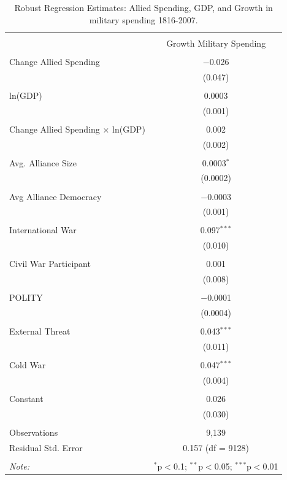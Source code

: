 \documentclass[12pt]{article}
\begin{document}
\begin{table}[!htbp] \centering 
  \caption{} 
  \label{} 
\begin{tabular}{@{\extracolsep{5pt}}lc} 
\\[-1.8ex]\hline 
\hline \\[-1.8ex] 
  & Growth Military Spending \\ 
\hline \\[-1.8ex] 
 Change Allied Spending & $-$0.026 \\ 
  & (0.047) \\ 
  & \\ 
 ln(GDP) & 0.0003 \\ 
  & (0.001) \\ 
  & \\ 
 Change Allied Spending $\times$ ln(GDP) & 0.002 \\ 
  & (0.002) \\ 
  & \\ 
 Avg. Alliance Size & 0.0003$^{*}$ \\ 
  & (0.0002) \\ 
  & \\ 
 Avg Alliance Democracy & $-$0.0003 \\ 
  & (0.001) \\ 
  & \\ 
 International War & 0.097$^{***}$ \\ 
  & (0.010) \\ 
  & \\ 
 Civil War Participant & 0.001 \\ 
  & (0.008) \\ 
  & \\ 
 POLITY & $-$0.0001 \\ 
  & (0.0004) \\ 
  & \\ 
 External Threat & 0.043$^{***}$ \\ 
  & (0.011) \\ 
  & \\ 
 Cold War & 0.047$^{***}$ \\ 
  & (0.004) \\ 
  & \\ 
 Constant & 0.026 \\ 
  & (0.030) \\ 
\hline \\[-1.8ex] 
Observations & 9,139 \\ 
Residual Std. Error & 0.157 (df = 9128) \\ 
\hline 
\hline \\[-1.8ex] 
\textit{Note:}  & \multicolumn{1}{r}{$^{*}$p$<$0.1; $^{**}$p$<$0.05; $^{***}$p$<$0.01} \\ 
\end{tabular} 
\caption{Robust Regression Estimates: Allied Spending, GDP, and Growth in military spending 1816-2007.}
\label{tab:rreg-res}
\end{table}
\end{document}
